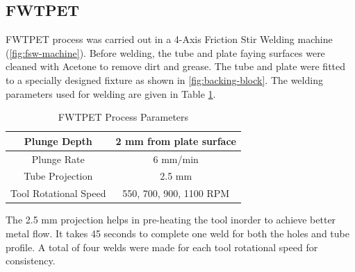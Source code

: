 \documentclass[3p]{elsarticle}
\begin{document}
\begingroup
\renewcommand*{\arraystretch}{1.5}
\begin{table}[!htbp]
\caption{Chemical Composition AA6061 Plate, Ti-6Al-4V Tube and Tungsten Alloy Tool (\%wt.)}
\label{table:base-material-composition} %
\centering
{}
\end{table}
\endgroup


\subsection{FWTPET}
\label{subsec:FWTPET}
FWTPET process was carried out in a 4-Axis Friction Stir Welding machine (\ref{fig:fsw-machine}). Before welding, the tube and plate faying surfaces were cleaned with Acetone to remove dirt and grease. The tube and plate were fitted to a specially designed fixture as shown in \ref{fig:backing-block}. The welding parameters used for welding are given in Table \ref{table:process-parameters}. 

\begin{table}[!htbp]
\caption{FWTPET Process Parameters}
\label{table:process-parameters} %
\centering
\begin{tabular}{|c|c|}
\hline 
Plunge Depth & 2 mm from plate surface \\ 
\hline 
Plunge Rate & 6 mm/min \\ 
\hline 
Tube Projection & 2.5 mm \\ 
\hline 
Tool Rotational Speed & 550, 700, 900, 1100 RPM \\ 
\hline 
\end{tabular} 
\end{table}

The 2.5 mm projection helps in pre-heating the tool inorder to achieve better metal flow. It takes 45 seconds to complete one weld for both the holes and tube profile. A total of four welds were made for each tool rotational speed for consistency.
\end{document}
